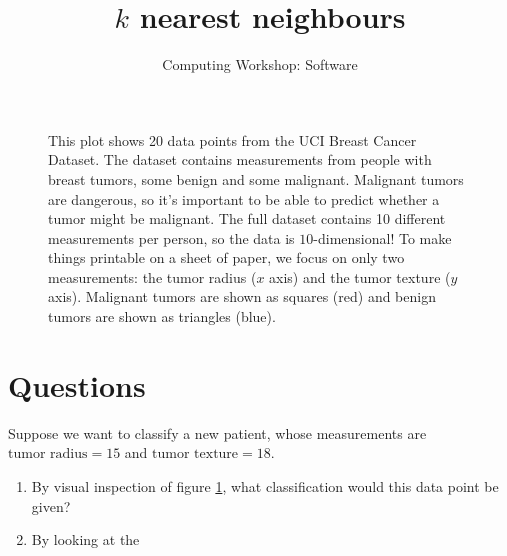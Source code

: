 \documentclass[11pt]{article}
\title{$k$ nearest neighbours}
\author{Computing Workshop: Software}
\begin{document}
\maketitle

\begin{figure}[h]
  \centering
  \caption{%
    This plot shows 20 data points from the UCI Breast Cancer Dataset.
    The dataset contains measurements from people with breast tumors, some
    benign and some malignant. Malignant tumors are dangerous, so it's important
    to be able to predict whether a tumor might be malignant.
    The full dataset contains 10 different measurements per person, so the data
    is $10$-dimensional! To make things printable on a sheet of paper, we focus
    on only two measurements: the tumor radius ($x$ axis) and the tumor texture
    ($y$ axis).%
    Malignant tumors are shown as squares (red) and benign tumors are shown as
    triangles (blue).
  }
  \label{fig:chart}
\end{figure}

\section*{Questions}

Suppose we want to classify a new patient, whose measurements are
$\text{tumor radius} = 15$ and $\text{tumor texture} = 18$.

\begin{enumerate}
\item
  By visual inspection of figure \ref{fig:chart}, what classification would this
  data point be given?
\item
  By looking at the 
\end{enumerate}
\end{document}
